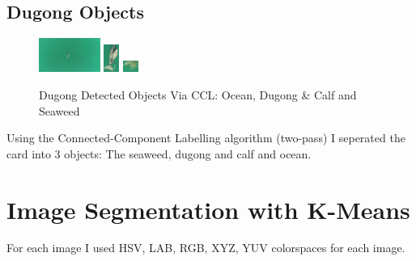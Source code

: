 \documentclass[conference]{IEEEtran}
\begin{document}
\subsection{Dugong Objects} 
\begin{figure}[htbp]
    \centerline{
        {\includegraphics[width=20mm, scale=0.5]{./figures/task 3/dugong/DetectedObject-1.png}}
        {\includegraphics[width=5mm, scale=0.5]{./figures/task 3/dugong/DetectedObject-2.png}}
        {\includegraphics[width=5mm, scale=0.5]{./figures/task 3/dugong/DetectedObject-3.png}}
    }
    \caption{Dugong Detected Objects Via CCL: Ocean, Dugong \& Calf and Seaweed}
    \label{fig}
\end{figure}
Using the Connected-Component Labelling algorithm (two-pass) I seperated the card into 3 objects: The seaweed, dugong and calf and ocean.

\section{Image Segmentation with K-Means}
For each image I used HSV, LAB, RGB, XYZ, YUV colorspaces for each image.
\end{document}
